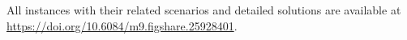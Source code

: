 All instances with their related scenarios and detailed solutions are available at \url{https://doi.org/10.6084/m9.figshare.25928401}.

%
%
%
